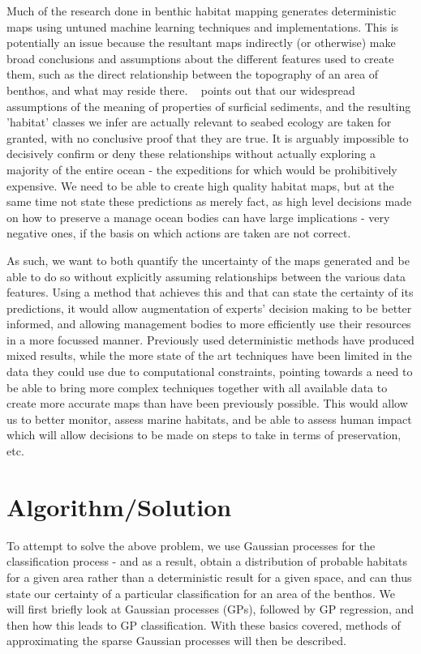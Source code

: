 \documentclass[10pt,sts]{article}
\begin{document}
\begin{multicols}{2}
    Much of the research done in benthic habitat mapping generates deterministic maps using untuned machine learning techniques and implementations. This is potentially an issue  because the resultant maps indirectly (or otherwise) make broad conclusions and assumptions about the different features used to create them, such as the direct relationship between the topography of an area of benthos, and what may reside there. ~\citet{kostylev12} points out that our widespread assumptions of the meaning of properties of surficial sediments, and the resulting 'habitat' classes we infer are actually relevant to seabed ecology are taken for granted, with no conclusive proof that they are true. It is arguably impossible to decisively confirm or deny these relationships without actually exploring a majority of the entire ocean - the expeditions for which would be prohibitively expensive. We need to be able to create high quality habitat maps, but at the same time not state these predictions as merely fact, as high level decisions made on how to preserve a manage ocean bodies can have large implications - very negative ones, if the basis on which actions are taken are not correct.

    As such, we want to both quantify the uncertainty of the maps generated and be able to do so without explicitly assuming relationships between the various data features. Using a method that achieves this and that can state the certainty of its predictions, it would allow augmentation of experts' decision making to be better informed, and allowing management bodies to more efficiently use their resources in a more focussed manner. Previously used deterministic methods have produced mixed results, while the more state of the art techniques have been limited in the data they could use due to computational constraints, pointing towards a need to be able to bring more complex techniques together with all available data to create more accurate maps than have been previously possible. This would allow us to better monitor, assess marine habitats, and be able to assess human impact which will allow decisions to be made on steps to take in terms of preservation, etc.

    \newpage

    \section{Algorithm/Solution}

    To attempt to solve the above problem, we use Gaussian processes for the classification process - and as a result, obtain a distribution of probable habitats for a given area rather than a deterministic result for a given space, and can thus state our certainty of a particular classification for an area of the benthos. We will first briefly look at Gaussian processes (GPs), followed by GP regression, and then how this leads to GP classification. With these basics covered, methods of approximating the sparse Gaussian processes will then be described. 


\end{multicols}
\end{document}
